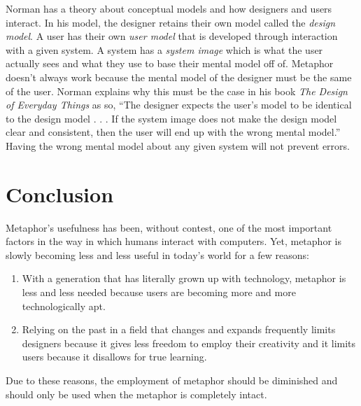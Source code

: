 \documentclass[11pt, oneside]{article}
\begin{document}
Norman has a theory about conceptual models and how designers and users interact. In his model, the designer retains their own model called the \textit{design model}. A user has their own \textit{user model} that is developed through interaction with a given system. A system has a \textit{system image} which is what the user actually sees and what they use to base their mental model off of.
Metaphor doesn't always work because the mental model of the designer must be the same of the user. Norman explains why this must be the case in his book \textit{The Design of Everyday Things} as so, ``The designer expects the user's model to be identical to the design model . . . If the system image does not make the design model clear and consistent, then the user will end up with the wrong mental model.''\cite{design-everyday} Having the wrong mental model about any given system will not prevent errors.


\section{Conclusion}
Metaphor's usefulness has been, without contest, one of the most important factors in the way in which humans interact with computers. Yet, metaphor is slowly becoming less and less useful in today's world for a few reasons:
\begin{enumerate}
\item With a generation that has literally grown up with technology, metaphor is less and less needed because users are becoming more and more technologically apt.
\item Relying on the past in a field that changes and expands frequently limits designers because it gives less freedom to employ their creativity and it limits users because it disallows for true learning.
\end{enumerate}
Due to these reasons, the employment of metaphor should be diminished and should only be used when the metaphor is completely intact.

\pagebreak


\end{document}
